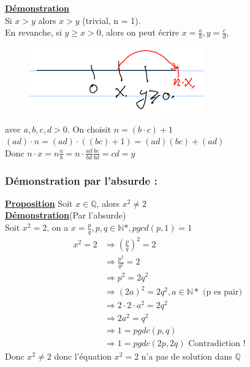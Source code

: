 \documentclass[12pt,a4paper]{article}
\newcommand{\evid}[1]{\textbf{\underline{#1}}}
\newcommand{\N}{\ensuremath{\mathbb{N}} }
\newcommand{\Q}{\ensuremath{\mathbb{Q}} }
\begin{document}
\evid{Démonstration} \\
Si $x > y$ alors $x > y$ (trivial, n = 1).\\
En revanche, si $y \geq x > 0$, alors on peut écrire $x= \frac{a}{b}, y = \frac{c}{d}$, 
\begin{figure}
\includegraphics[scale=1]{Illustrations_Analyse/archimedien.png}
\end{figure}
avec $a,b,c,d > 0$. On choisit $n = (b\cdot c) + 1$\\
$(ad)\cdot n = (ad)\cdot((bc)+1) = (ad)(bc)+(ad)$\\
Donc $n\cdot x = n \frac{a}{b} = n\cdot \frac{ad}{bd} \frac{bc}{bd} = cd = y$

\subsubsection{Démonstration par l'absurde :}
\evid{Proposition} Soit $x \in \Q$, alors $x^2 \neq 2$\\
\evid{Démonstration}(Par l'absurde)\\
Soit $x^2 = 2$, on a $x = \frac{p}{q}, p,q \in \N*, pgcd(p,1) = 1$\\
\begin{align*}
	x^2 = 2 & \Rightarrow \left(\frac{p}{q}\right)^2 = 2\\
			& \Rightarrow  \frac{p^2}{q^2} = 2\\
			& \Rightarrow p^2 = 2q^2\\
			& \Rightarrow (2a)^2 = 2q^2, a \in \N*\mbox{ (p es pair)}\\
			& \Rightarrow 2\cdot 2 \cdot a^2 = 2q^2\\
			& \Rightarrow 2a^2 = q^2\\
			& \Rightarrow 1 = pgdc(p,q)\\
			& \Rightarrow 1 = pgdc(2p,2q) \mbox{ Contradiction !}
\end{align*}
Donc $x^2 \neq 2$ donc l'équation $x^2 = 2$ n'a pas de solution dans $\Q$
\end{document}
